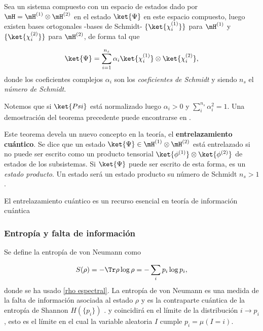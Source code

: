  \begin{theorem}
 \label{Schmidt decomp}
 Sea un sistema compuesto con un espacio de estados dado por $\mH =\mH^{(1)} \otimes \mH^{(2)}$ en el estado $\ket{\Psi}$ en este espacio compuesto, luego existen bases ortogonales -bases de Schmidt- $\{ \ket{\chi_i^{(1)}}\}$ para $\mH^{(1)}$ y $\{ \ket{\chi_i^{(2)}}\}$  para $\mH^{(2)}$, de forma tal que
 
 \begin{equation}
     \ket{\Psi} = \sum_{i=1} ^{n_s}\alpha_i \ket{\chi_i^{(1)}} \otimes \ket{\chi_i^{(2)}},
 \end{equation}
 donde los coeficientes complejos $\alpha_i$ son los \textit{coeficientes de Schmidt} y siendo $n_s$ el \textit{número de Schmidt}. 
 \end{theorem}
 Notemos que si $\ket{Psi}$ está normalizado luego $\alpha_i > 0$ y $\sum_i^{n_s}\alpha_i^2 = 1$.
 Una demostración del teorema precedente puede encontrarse en \cite{Nielsen.00, HeinzPetruccione}.
 
 Este teorema devela un nuevo concepto en la teoría, el \textbf{entrelazamiento cuántico}. Se dice que un estado $\ket{\Psi} \in \mH^{(1)} \otimes \mH^{(2)}$ está entrelazado si no puede ser escrito como un producto tensorial $\ket{\phi^{(1)}} \otimes \ket{\phi^{(2)}}$ de estados de los subsistemas. Si $\ket{\Psi}$ puede ser escrito de esta forma, es un \textit{estado producto}.  Un estado será un estado producto \sii su número de Schmidt $n_s > 1$.  
 
 El entrelazamiento cuántico es un recurso esencial en teoría de información cuántica 
 
 
 \subsubsection{Entropía y falta de información}
 
 Se define la entropía de von Neumann \cite{Nielsen.00, HeinzPetruccione, VonNeumann:1955, WehrlA, Neumann1927} como 
 
 \begin{align}
     S(\rho) = - \Tr \rho \log \rho = - \sum_i p_i \log p_i,
     \label{von Neumann's entropy}
 \end{align}
 donde se ha usado \eqref{rho espectral}.
 La entropía de von Neumann es una medida de la falta de información asociada al estado $\rho$ y es la contraparte cuántica de la entropía de Shannon $H(\{p_i\})$
 \cite{Shannon48}. y coincidirá en el límite de la distribución $i \rightarrow p_i$, esto es el límite en el cual la variable aleatoria $I$ cumple $p_i = \mu (I=i)$\cite{HeinzPetruccione}. 
 
